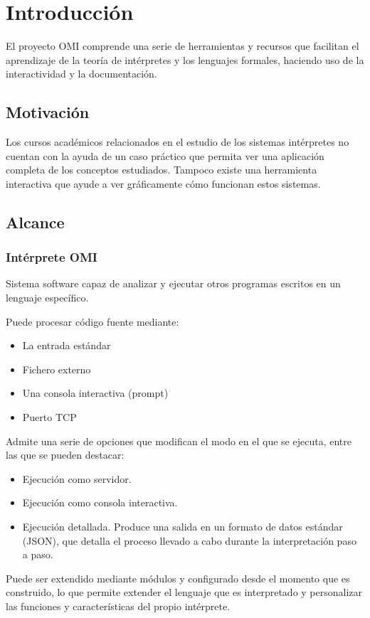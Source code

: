 \section {Introducción}
El proyecto OMI comprende una serie de herramientas y recursos que facilitan el aprendizaje de la
teoría de intérpretes y los lenguajes formales, haciendo uso de la interactividad y la documentación.

\subsection{Motivación}
Los cursos académicos relacionados en el estudio de los sistemas intérpretes no cuentan con la ayuda de un caso 
práctico que permita ver una aplicación completa de los conceptos estudiados. Tampoco existe una herramienta interactiva que 
ayude a ver gráficamente cómo funcionan estos sistemas.

\subsection {Alcance}
\subsubsection{Intérprete OMI}
Sistema software capaz de analizar y ejecutar otros programas escritos en un lenguaje específico.

Puede procesar código fuente mediante:
\begin{itemize}
\item La entrada estándar
\item Fichero externo
\item Una consola interactiva (prompt)
\item Puerto TCP
\end{itemize}

 Admite una serie de opciones que modifican el modo en el que se ejecuta, entre las que se pueden destacar:
 \begin{itemize}
 \item Ejecución como servidor.
 \item Ejecución como consola interactiva.
 \item Ejecución detallada. Produce una salida en un formato de datos estándar (JSON), que detalla el proceso 
 llevado a cabo durante la interpretación paso a paso.
\end{itemize}

Puede ser extendido mediante módulos y configurado desde el momento que es construido, lo que permite extender el lenguaje que es interpretado y personalizar
las funciones y características del propio intérprete.

